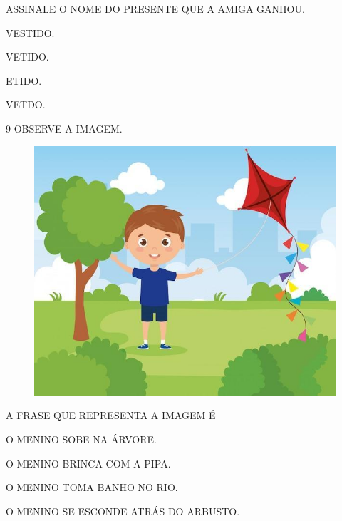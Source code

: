 ASSINALE O NOME DO PRESENTE QUE A AMIGA GANHOU.

\begin{multicols}{2}
\begin{escolha}
\item VESTIDO.

\item VETIDO.

\item ETIDO.

\item VETDO.
\end{escolha}
\end{multicols}

\num{9} OBSERVE A IMAGEM.

\begin{figure}[H]
\centering
\includegraphics[width=\textwidth]{media/image233.jpg}
\end{figure}

A FRASE QUE REPRESENTA A IMAGEM É

\begin{escolha}[itemsep=-5pt]
\item O MENINO SOBE NA ÁRVORE.

\item O MENINO BRINCA COM A PIPA.

\item O MENINO TOMA BANHO NO RIO.

\item O MENINO SE ESCONDE ATRÁS DO ARBUSTO.
\end{escolha}

